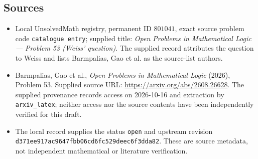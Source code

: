 \documentclass[11pt]{article}
\begin{document}
\subsection{Sources}
\begin{itemize}
\item Local UnsolvedMath registry, permanent ID \(801041\), exact source problem code \texttt{catalogue entry}; supplied title: \emph{Open Problems in Mathematical Logic --- Problem 53 (Weiss' question)}. The supplied record attributes the question to Weiss and lists Barmpalias, Gao et al. as the source-list authors.
\item Barmpalias, Gao et al., \emph{Open Problems in Mathematical Logic} (2026), Problem 53. Supplied source URL: \url{https://arxiv.org/abs/2608.26628}. The supplied provenance records access on 2026-10-16 and extraction by \texttt{arxiv\_latex}; neither access nor the source contents have been independently verified for this draft.
\item The local record supplies the status \texttt{open} and upstream revision \texttt{d371ee917ac9647fbb06cd6fc529deec6f3dda82}. These are source metadata, not independent mathematical or literature verification.
\end{itemize}
\end{document}
